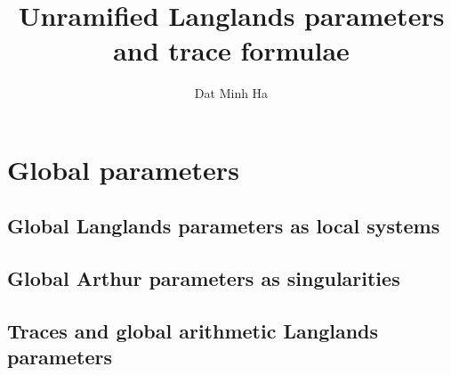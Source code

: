 

\setcounter{section}{-1}





	\title{Unramified Langlands parameters and trace formulae}
	
	\author{Dat Minh Ha}
	\maketitle
	
	\begin{abstract}
	    
	\end{abstract}
	
	{
      \hypersetup{} 
      \tableofcontents %
    }
    
    \part{Global parameters}
        \chapter{Global Langlands parameters as local systems}
            \begin{abstract}
                
            \end{abstract}
    
            \minitoc
    
        \chapter{Global Arthur parameters as singularities}
            \begin{abstract}
                
            \end{abstract}
    
            \minitoc
            
        \chapter{Traces and global arithmetic Langlands parameters}
            \begin{abstract}
                
            \end{abstract}
    
